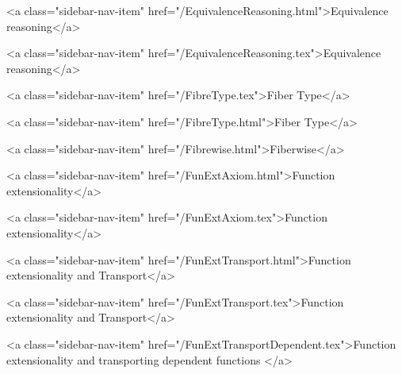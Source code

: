       
    
      
        
          <a class="sidebar-nav-item" href="/EquivalenceReasoning.html">Equivalence reasoning</a>
        
      
    
      
        
          <a class="sidebar-nav-item" href="/EquivalenceReasoning.tex">Equivalence reasoning</a>
        
      
    
      
        
          <a class="sidebar-nav-item" href="/FibreType.tex">Fiber Type</a>
        
      
    
      
        
          <a class="sidebar-nav-item" href="/FibreType.html">Fiber Type</a>
        
      
    
      
        
          <a class="sidebar-nav-item" href="/Fibrewise.html">Fiberwise</a>
        
      
    
      
        
          <a class="sidebar-nav-item" href="/FunExtAxiom.html">Function extensionality</a>
        
      
    
      
        
          <a class="sidebar-nav-item" href="/FunExtAxiom.tex">Function extensionality</a>
        
      
    
      
        
          <a class="sidebar-nav-item" href="/FunExtTransport.html">Function extensionality and Transport</a>
        
      
    
      
        
          <a class="sidebar-nav-item" href="/FunExtTransport.tex">Function extensionality and Transport</a>
        
      
    
      
        
          <a class="sidebar-nav-item" href="/FunExtTransportDependent.tex">Function extensionality and transporting dependent functions </a>
        
      
    
      
        
